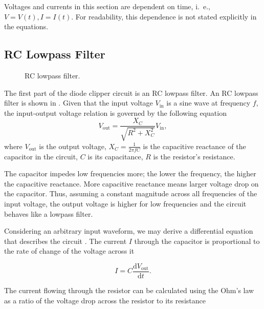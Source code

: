 Voltages and currents in this section are dependent on time, i.\ e., $V = V(t), I= I(t)$. For readability, this dependence is not stated explicitly in the equations.

\subsection*{RC Lowpass Filter}

\begin{figure}
  \centering
  
  \caption{RC lowpass filter.}
  \label{fig:rc_lowpass}
\end{figure}

The first part of the diode clipper circuit is an RC lowpass filter. An RC lowpass filter is shown in . Given that the input voltage $V_\text{in}$ is a sine wave at frequency $f$, the input-output voltage relation is governed by the following equation
\begin{equation}
  V_\text{out} = \frac{X_C}{\sqrt{R^2 + X_C^2}} V_\text{in},
  \label{eq:rc_circuit}
\end{equation}
where $V_\text{out}$ is the output voltage, $X_C=\frac{1}{2\pi f C}$ is the capacitive reactance of the capacitor in the circuit, $C$ is its capacitance, $R$ is the resistor's resistance.

The capacitor impedes low frequencies more; the lower the frequency, the higher the capacitive reactance. More capacitive reactance means larger voltage drop on the capacitor. Thus, assuming a constant magnitude across all frequencies of the input voltage, the output voltage is higher for low frequencies and the circuit behaves like a lowpass filter.

Considering an arbitrary input waveform, we may derive a differential equation that describes the circuit \cite{Horowitz2015}. The current $I$ through the capacitor is proportional to the rate of change of the voltage across it

\begin{equation}
  I = C \frac{\mathrm{d}V_\text{out}}{\mathrm{d} t}.
  \label{eq:current_through_capacitor}
\end{equation}

The current flowing through the resistor can be calculated using the Ohm's law as a ratio of the voltage drop across the resistor to its resistance

